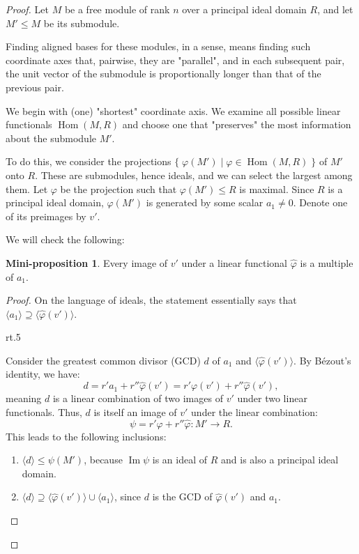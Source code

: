 \documentclass{article}
\newif\ifusemulticols
\newif\ifmobileview
\theoremstyle{definition}
\newtheorem{miniprop}{Mini-proposition}[section]
\theoremstyle{remark}
\theoremstyle{plain}
\theoremstyle{plain}
\newenvironment{mymulticols}
    { \ifusemulticols \begin{multicols}{2} \fi }
    { \ifusemulticols \end{multicols} \fi }
\newcommand\mywrapbegin[3]{\ifmobileview\else\begin{wrapfigure}[#1]{#2}{#3}\fi}
\newcommand\mywrapend{\ifmobileview\else\end{wrapfigure}\fi}
\DeclareMathOperator{\image}{Im}
\DeclareMathOperator{\Hom}{Hom}
\begin{document}
\begin{mymulticols}
\begin{proof}
    Let $M$ be a free module of rank $n$ over a principal ideal domain $R$, and let $M' \le M$ be
    its submodule.

    Finding aligned bases for these modules, in a sense, means finding such coordinate axes that,
    pairwise, they are "parallel", and in each subsequent pair, the unit
    vector of the submodule is proportionally longer than that of the previous pair.

    We begin with (one) "shortest" coordinate axis. We examine all
    possible linear functionals $\Hom(M, R)$ and choose one that 
    "preserves" the most information about the submodule $M'$.

    To do this, we consider the projections $\{\;\varphi(M') \;|\; \varphi \in \Hom(M,R) \;\}$ of
    $M'$ onto $R$. These are submodules, hence ideals, and we can select the largest among them. 
    Let $\varphi$ be the projection such that $\varphi(M') \le R$ is maximal. Since $R$ is a principal
    ideal domain, $\varphi(M')$ is generated by some scalar $a_1 \neq 0$. Denote one of its preimages by $v'$.

    We will check the following:
    \begin{miniprop}
        Every image of $v'$ under a linear functional $\widehat{\varphi}$ is a multiple of $a_1$.
    \end{miniprop}

    \begin{proof}
        On the language of ideals, the statement essentially says that 
        $\langle a_1 \rangle \supseteq \langle \widehat{\varphi}(v') \rangle$.

        \begin{minipage}[t]{\linewidth}
            \mywrapbegin{13}{rt}{.5\linewidth}\vspace{-\intextsep}
            \mywrapend

            Consider the greatest common divisor (GCD) $d$ of $a_1$ and $\langle \widehat{\varphi}(v') \rangle$. 
            By Bézout's identity, we have:
            $$d = r' a_1 + r'' \widehat{\varphi}(v') = r' \varphi(v') + r'' \widehat{\varphi}(v'),$$
            meaning $d$ is a linear combination of two images of $v'$ under two linear functionals. 
            Thus, $d$ is itself an image of $v'$ under the linear combination:
            $$\psi = r' \varphi + r'' \widehat{\varphi} : M' \to R.$$
            This leads to the following inclusions:
            \begin{enumerate}
                \item $\langle d \rangle \le \psi(M')$, because $\image \psi$ is an ideal of $R$ and is also a principal ideal domain.
                \item $\langle d \rangle \supseteq \langle \widehat{\varphi}(v') \rangle \cup \langle
                    a_1 \rangle$, since $d$ is the GCD of $\widehat{\varphi}(v')$ and $a_1$.
            \end{enumerate}


\end{minipage}
\end{proof}
\end{proof}
\end{mymulticols}
\end{document}
